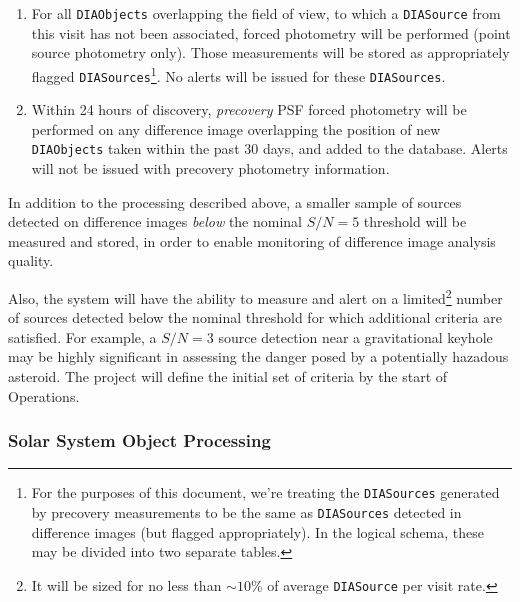 \documentclass[12pt]{article}
\newcommand{\code}[1]{\texttt{#1}}
\newcommand{\DIASource}{\code{DIASource}\xspace}
\newcommand{\DIASources}{\code{DIASources}\xspace}
\newcommand{\DIAObjects}{\code{DIAObjects}\xspace}
\begin{document}
\begin{enumerate}
\item For all \DIAObjects overlapping the field of view, to which a \DIASource from this visit has not been associated, forced photometry will be performed (point source photometry only). Those measurements will be stored as appropriately flagged \DIASources\footnote{For the purposes of this document, we're treating the \DIASources generated by precovery measurements to be the same as \DIASources detected in difference images (but flagged appropriately). In the logical schema, these may be divided into two separate tables.}.  No alerts will be issued for these \DIASources.
\item Within 24 hours of discovery, {\em precovery} PSF forced photometry will be performed on any difference image overlapping the position of new \DIAObjects taken within the past 30 days, and added to the database. Alerts will not be issued with precovery photometry information.
\end{enumerate}

In addition to the processing described above, a smaller sample of sources detected on difference images {\em below} the nominal $S/N=5$ threshold will be measured and stored, in order to enable monitoring of difference image analysis quality.

Also, the system will have the ability to measure and alert on a limited\footnote{It will be sized for no less than $\sim 10\%$ of average \DIASource per visit rate.} number of sources detected below the nominal threshold for which additional criteria are satisfied. For example, a $S/N = 3$ source detection near a gravitational keyhole may be highly significant in assessing the danger posed by a potentially hazadous asteroid. The project will define the initial set of criteria by the start of Operations.

\subsubsection{Solar System Object Processing}
\label{sec:ssProcessing}
\end{document}
